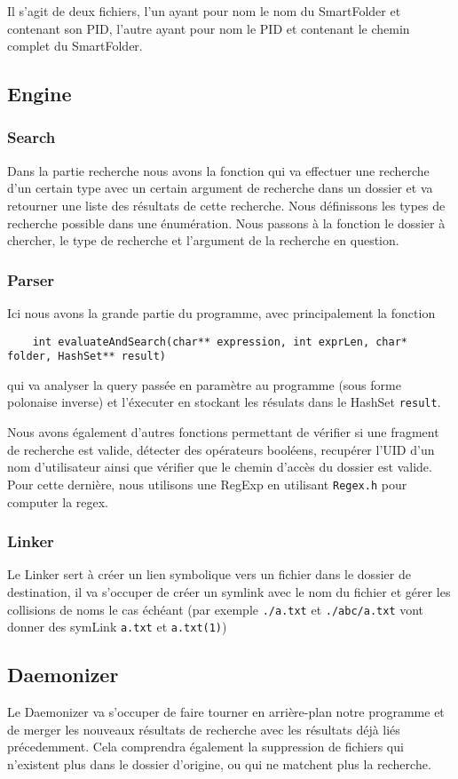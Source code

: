 \documentclass[a4paper]{article}
\begin{document}
Il s'agit de deux fichiers, l'un ayant pour nom le nom du SmartFolder et contenant son PID, l'autre ayant pour nom le PID et contenant le chemin complet du SmartFolder.
\subsection{Engine}
\subsubsection{Search}
Dans la partie recherche nous avons la fonction qui va effectuer une recherche d'un certain type avec un certain argument de recherche dans un dossier et va retourner une liste des résultats de cette recherche. Nous définissons les types de recherche possible dans une énumération. Nous passons à la fonction le dossier à chercher, le type de recherche et l'argument de la recherche en question.
\subsubsection{Parser}
Ici nous avons la grande partie du programme, avec principalement la fonction
\begin{verbatim}
	int evaluateAndSearch(char** expression, int exprLen, char* folder, HashSet** result)
\end{verbatim}
qui va analyser la query passée en paramètre au programme (sous forme polonaise inverse) et l'éxecuter en stockant les résulats dans le HashSet \verb+result+.

Nous avons également d'autres fonctions permettant de vérifier si une fragment de recherche est valide, détecter des opérateurs booléens, recupérer l'UID d'un nom d'utilisateur ainsi que vérifier que le chemin d'accès du dossier est valide. Pour cette dernière, nous utilisons une RegExp en utilisant \verb+Regex.h+ pour computer la regex.
\subsubsection{Linker}
Le Linker sert à créer un lien symbolique vers un fichier dans le dossier de destination, il va s'occuper de créer un symlink avec le nom du fichier et gérer les collisions de noms le cas échéant (par exemple \verb+./a.txt+ et \verb+./abc/a.txt+ vont donner des symLink \verb+a.txt+ et \verb+a.txt(1)+)
\subsection{Daemonizer}
Le Daemonizer va s'occuper de faire tourner en arrière-plan notre programme et de merger les nouveaux résultats de recherche avec les résultats déjà liés précedemment. Cela comprendra également la suppression de fichiers qui n'existent plus dans le dossier d'origine, ou qui ne matchent plus la recherche.
\end{document}
